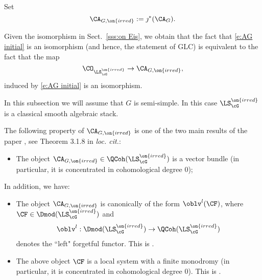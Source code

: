 \documentclass[9pt]{amsart}
\theoremstyle{remark}
\theoremstyle{definition}
\theoremstyle{remark}
\newcommand{\secref}[1]{Sect.~\ref{#1}}
\numberwithin{equation}{section}
\begin{document}
\sssec{} \label{sss:red to irred}

Set
$$\CA_{G,\on{irred}}:=\jmath^*(\CA_G).$$

Given the isomorphism in \secref{sss:on Eis}, we obtain that the fact that \eqref{e:AG initial} is an isomorphism 
(and hence, the statement of GLC) is equivalent to the fact that 
the map 
\begin{equation} \label{e:AG irred}
\CO_{\LS^{\on{irred}}_\cG}\to \CA_{G,\on{irred}}, 
\end{equation}
induced by \eqref{e:AG initial} is an isomorphism.

 \label{ss:AG nice}

\sssec{}

In this subsection we will assume that $G$ is semi-simple. In this case $\LS_\cG^{\on{irred}}$ is a classical smooth algebraic stack.

\sssec{} \label{sss:AG nice}

The following property of $\CA_{G,\on{irred}}$ is one of the two main results of
the paper \cite{GLC4}, see Theorem 3.1.8 in {\it loc. cit.}:

\medskip

\begin{itemize}

\item The object $\CA_{G,\on{irred}}\in \QCoh(\LS_\cG^{\on{irred}})$ is a vector bundle (in particular, it is concentrated in cohomological degree $0$);

\end{itemize} 

\sssec{}  \label{sss:AG conn}

In addition, we have: 

\medskip

\begin{itemize}

\item The object $\CA_{G,\on{irred}}$ is canonically of the form
$\oblv^l(\CF)$, where $\CF\in \Dmod(\LS_\cG^{\on{irred}})$ and 
$$\oblv^l:\Dmod(\LS_\cG^{\on{irred}})\to \QCoh(\LS_\cG^{\on{irred}})$$
denotes the ``left" forgetful functor. This is \cite[Corollary 4.2.5]{GLC4}. 

\medskip

\item The above object $\CF$ is a local system
with a finite monodromy (in particular, it is concentrated in cohomological degree $0$). This is \cite[Proposition 4.2.8]{GLC4}. 

\end{itemize}
\end{document}
